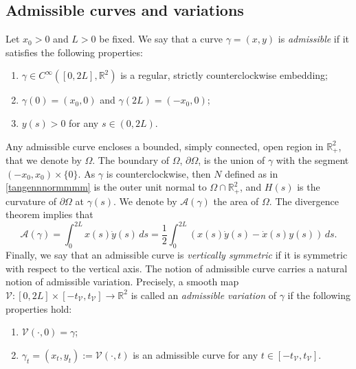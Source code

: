 \documentclass[11pt]{amsart}
\newcommand{\A}{\mathcal A}
\newcommand{\rr}{{\mathbb{R}}}
\newcommand{\Om}{\Omega}
\theoremstyle{definition}
\theoremstyle{remark}
\numberwithin{equation}{section}
\begin{document}
	\subsection{Admissible curves and variations}\label{sec_admissiblecurves}
	Let $x_0>0$ and $L>0$ be fixed.
	We say that a curve $\gamma=(x,y)$ is \emph{admissible} if it satisfies the following properties:
	\medskip
	\begin{enumerate}
		\item [(i)]$\gamma\in C^\infty([0,2L],\rr^2)$ is a regular, strictly counterclockwise embedding;
		\medskip
		\item [(ii)]$\gamma(0)=(x_0,0)$ and $\gamma(2L)=(-x_0,0)$;
		\medskip
		\item [(iii)]$y(s)>0$ for any $s\in(0,2L)$.
	\end{enumerate}
	\medskip
	Any admissible curve encloses a bounded, simply connected, open region in $\rr^2_+$, that we denote by $\Omega$. The boundary of $\Omega$, $\partial\Om$, is the union of $\gamma$ with the segment $\left(-x_0,x_0\right)\times\{0\}$. As $\gamma$ is counterclockwise, then $N$ defined as in \eqref{tangennnormmmm} is the outer unit normal to $\Om\cap \rr^2_+$, and $H(s)$ is the curvature of $\partial\Om$ at $\gamma(s)$. We denote by $\A(\gamma)$ the area of $\Omega$. The divergence theorem implies that
	\begin{equation}\label{volumediomegaincurva}
		\A(\gamma)=\int_{0}^{2L}x(s)\dot y(s)\,ds=\frac{1}{2}\int_{0}^{2L}\left(x(s)\dot y(s)-\dot x(s) y(s)\right)\,ds.
	\end{equation}
	Finally, we say that an admissible curve is \emph{vertically symmetric} if it is symmetric with respect to the vertical axis.        %
	The notion of admissible curve carries a natural notion of admissible variation. Precisely, a smooth map $\mathcal V:[0,2L]\times[-t_{\mathcal V},t_{\mathcal V}]\to\rr^2$ is called an \emph{admissible variation} of $\gamma$ if the following properties hold:
	\medskip
	\begin{enumerate}
		\item[(i)] $\mathcal V(\cdot,0)=\gamma$;
		\medskip
		\item[(ii)] $\gamma_t=(x_t,y_t):=\mathcal V(\cdot,t)$ is an admissible curve for any $t\in[-t_{\mathcal V},t_{\mathcal V}].$
		\medskip
	\end{enumerate}
\end{document}

